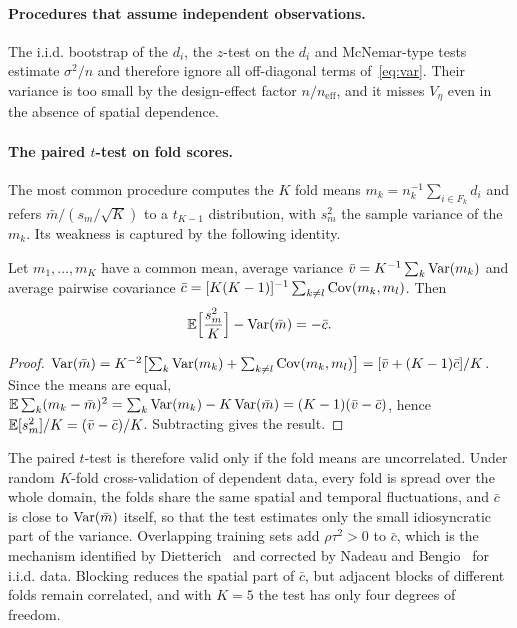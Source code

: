 \paragraph{Procedures that assume independent observations.}
The i.i.d. bootstrap of the $d_i$, the $z$-test on the $d_i$ and McNemar-type tests estimate $\sigma^2/n$ and therefore ignore all off-diagonal terms of~\eqref{eq:var}. Their variance is too small by the design-effect factor $n/n_{\mathrm{eff}}$, and it misses $V_\eta$ even in the absence of spatial dependence.

\paragraph{The paired $t$-test on fold scores.}
The most common procedure computes the $K$ fold means $m_k=n_k^{-1}\sum_{i\in F_k}d_i$ and refers $\bar m/(s_m/\sqrt K)$ to a $t_{K-1}$ distribution, with $s_m^2$ the sample variance of the $m_k$. Its weakness is captured by the following identity.

\begin{proposition}\label{prop:pairedt}
Let $m_1,\dots,m_K$ have a common mean, average variance $\bar v=K^{-1}\sum_k\operatorname{Var}(m_k)$ and average pairwise covariance $\bar c=[K(K-1)]^{-1}\sum_{k\neq l}\operatorname{Cov}(m_k,m_l)$. Then
\[
\mathbb{E}\Bigl[\frac{s_m^2}{K}\Bigr]-\operatorname{Var}(\bar m)=-\bar c .
\]
\end{proposition}

\begin{proof}
$\operatorname{Var}(\bar m)=K^{-2}\bigl[\sum_k\operatorname{Var}(m_k)+\sum_{k\neq l}\operatorname{Cov}(m_k,m_l)\bigr]=[\bar v+(K-1)\bar c]/K$. Since the means are equal, $\mathbb{E}\sum_k(m_k-\bar m)^2=\sum_k\operatorname{Var}(m_k)-K\operatorname{Var}(\bar m)=(K-1)(\bar v-\bar c)$, hence $\mathbb{E}[s_m^2]/K=(\bar v-\bar c)/K$. Subtracting gives the result.
\end{proof}

The paired $t$-test is therefore valid only if the fold means are uncorrelated. Under random $K$-fold cross-validation of dependent data, every fold is spread over the whole domain, the folds share the same spatial and temporal fluctuations, and $\bar c$ is close to $\operatorname{Var}(\bar m)$ itself, so that the test estimates only the small idiosyncratic part of the variance. Overlapping training sets add $\rho\tau^2>0$ to $\bar c$, which is the mechanism identified by Dietterich~\cite{dietterich1998} and corrected by Nadeau and Bengio~\cite{nadeau2003} for i.i.d. data. Blocking reduces the spatial part of $\bar c$, but adjacent blocks of different folds remain correlated, and with $K=5$ the test has only four degrees of freedom.

